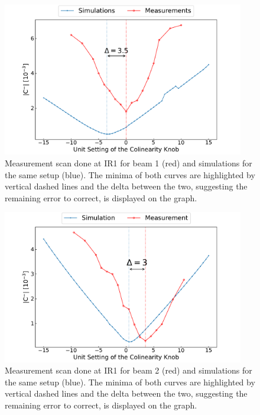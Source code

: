 \begin{figure}[!htb]
    \centering
    \includegraphics*[width=0.94\textwidth]{Figures/IR_Coupling_Correction/rws_measurement_ir1_b1_pos.pdf}
    \caption{Measurement scan done at IR\num{1} for beam \num{1} (\textcolor{mplr}{red}) and simulations for the same setup (\textcolor{mplblue}{blue}). The minima of both curves are highlighted by vertical dashed lines and the delta between the two, suggesting the remaining error to correct, is displayed on the graph.}
    \label{figure:ir1_b1_pos_measurement}
\end{figure}

\begin{figure}[!htb]
    \centering
    \includegraphics*[width=0.94\textwidth]{Figures/IR_Coupling_Correction/rws_measurement_ir1_b2_pos.pdf}
    \caption{Measurement scan done at IR\num{1} for beam \num{2} (\textcolor{mplr}{red}) and simulations for the same setup (\textcolor{mplblue}{blue}). The minima of both curves are highlighted by vertical dashed lines and the delta between the two, suggesting the remaining error to correct, is displayed on the graph.}
    \label{figure:ir1_b2_pos_measurement}
\end{figure}

